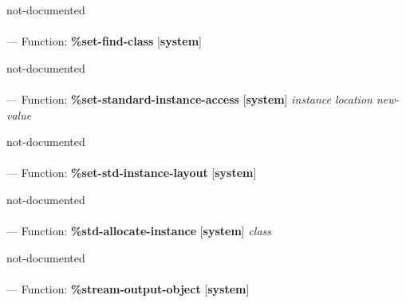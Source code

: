 \begin{adjustwidth}{5em}{5em}
not-documented
\end{adjustwidth}

\paragraph{}
\label{SYSTEM:SET-FIND-CLASS}
--- Function: \textbf{\%set-find-class} [\textbf{system}] \textit{}

\begin{adjustwidth}{5em}{5em}
not-documented
\end{adjustwidth}

\paragraph{}
\label{SYSTEM:SET-STANDARD-INSTANCE-ACCESS}
--- Function: \textbf{\%set-standard-instance-access} [\textbf{system}] \textit{instance location new-value}

\begin{adjustwidth}{5em}{5em}
not-documented
\end{adjustwidth}

\paragraph{}
\label{SYSTEM:SET-STD-INSTANCE-LAYOUT}
--- Function: \textbf{\%set-std-instance-layout} [\textbf{system}] \textit{}

\begin{adjustwidth}{5em}{5em}
not-documented
\end{adjustwidth}

\paragraph{}
\label{SYSTEM:STD-ALLOCATE-INSTANCE}
--- Function: \textbf{\%std-allocate-instance} [\textbf{system}] \textit{class}

\begin{adjustwidth}{5em}{5em}
not-documented
\end{adjustwidth}

\paragraph{}
\label{SYSTEM:STREAM-OUTPUT-OBJECT}
--- Function: \textbf{\%stream-output-object} [\textbf{system}] \textit{}

